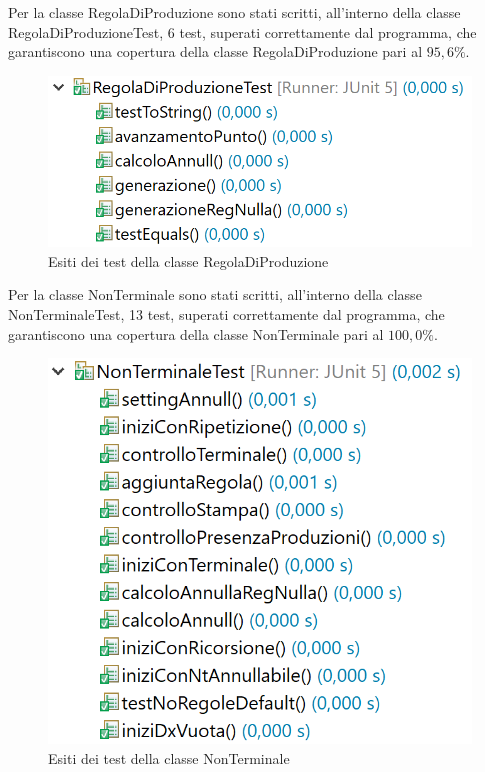 \documentclass[12pt]{article}
\newcounter{subsubsubsection}[subsubsection]
\begin{document}
Per la classe RegolaDiProduzione sono stati scritti, all'interno della classe RegolaDiProduzioneTest, 6 test, superati correttamente dal programma, che garantiscono una copertura della classe RegolaDiProduzione pari al $95,6\%$.
\begin{figure}[h]
\centering
\includegraphics[scale=0.4]{immagini/esitiRegolaDiProduzioneTest.png}
\caption{Esiti dei test della classe RegolaDiProduzione}
\end{figure}
Per la classe NonTerminale sono stati scritti, all'interno della classe NonTerminaleTest, 13 test, superati correttamente dal programma, che garantiscono una copertura della classe NonTerminale pari al $100,0\%$.
\begin{figure}[h]
\centering
\includegraphics[scale=0.4]{immagini/esitiNonTerminaleTest.png}
\caption{Esiti dei test della classe NonTerminale}
\end{figure}
\end{document}
